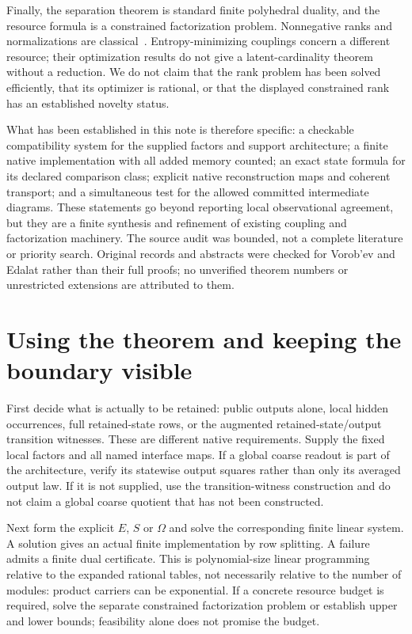 \documentclass[11pt]{article}
\theoremstyle{remark}
\begin{document}
Finally, the separation theorem is standard finite polyhedral duality, and the resource formula is a constrained factorization problem. Nonnegative ranks and normalizations are classical~\cite{CohenRothblum1993}. Entropy-minimizing couplings concern a different resource; their optimization results do not give a latent-cardinality theorem without a reduction. We do not claim that the rank problem has been solved efficiently, that its optimizer is rational, or that the displayed constrained rank has an established novelty status.

What has been established in this note is therefore specific: a checkable compatibility system for the supplied factors and support architecture; a finite native implementation with all added memory counted; an exact state formula for its declared comparison class; explicit native reconstruction maps and coherent transport; and a simultaneous test for the allowed committed intermediate diagrams. These statements go beyond reporting local observational agreement, but they are a finite synthesis and refinement of existing coupling and factorization machinery. The source audit was bounded, not a complete literature or priority search. Original records and abstracts were checked for Vorob'ev and Edalat rather than their full proofs; no unverified theorem numbers or unrestricted extensions are attributed to them.

\section{Using the theorem and keeping the boundary visible}

First decide what is actually to be retained: public outputs alone, local hidden occurrences, full retained-state rows, or the augmented retained-state/output transition witnesses. These are different native requirements. Supply the fixed local factors and all named interface maps. If a global coarse readout is part of the architecture, verify its statewise output squares rather than only its averaged output law. If it is not supplied, use the transition-witness construction and do not claim a global coarse quotient that has not been constructed.

Next form the explicit $E$, $S$ or $\Omega$ and solve the corresponding finite linear system. A solution gives an actual finite implementation by row splitting. A failure admits a finite dual certificate. This is polynomial-size linear programming relative to the expanded rational tables, not necessarily relative to the number of modules: product carriers can be exponential. If a concrete resource budget is required, solve the separate constrained factorization problem or establish upper and lower bounds; feasibility alone does not promise the budget.
\end{document}
